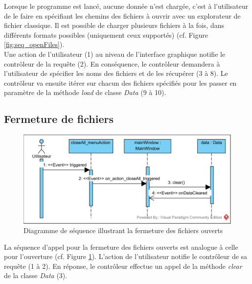 \documentclass[12pt]{article}
\begin{document}
		Lorsque le programme est lancé, aucune donnée n’est chargée, c’est à l’utilisateur de le faire en spécifiant les chemins des fichiers à ouvrir avec un explorateur de fichier classique. Il est possible de charger plusieurs fichiers à la fois, dans différents formats possibles (uniquement ceux supportés) (cf. Figure \ref{fig:seq_openFiles}).\\
	Une action de l’utilisateur (1) au niveau de l’interface graphique notifie le contrôleur de la requête (2). En conséquence, le contrôleur demandera à l’utilisateur de spécifier les noms des fichiers et de les récupérer (3 à 8). Le contrôleur va ensuite itérer sur chacun des fichiers spécifiés pour les passer en paramètre de la méthode \textit{load} de classe \textit{Data} (9 à 10).
	
		\newpage
		\subsection{Fermeture de fichiers}
		\begin{figure}[!h]
		\begin{center}
		\includegraphics[scale=1]{dia_sequence_closeFiles.png}
		\caption{Diagramme de séquence illustrant la fermeture des fichiers ouverts}
		\label{fig:seq_closeFiles}
		\end{center}
		\end{figure}
			
		La séquence d’appel pour la fermeture des fichiers ouverts est analogue à celle pour l’ouverture (cf. Figure \ref{fig:seq_closeFiles}). L’action de l’utilisateur notifie le contrôleur de sa requête (1 à 2). En réponse, le contrôleur effectue un appel de la méthode \textit{clear} de la classe \textit{Data} (3).
			
			
\end{document}
